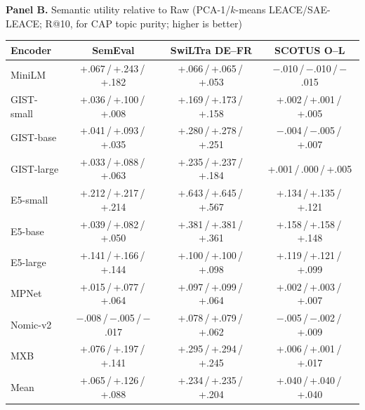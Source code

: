 \vspace{1pt}
\par{\textbf{Panel B.} Semantic utility relative to Raw (PCA-1/$k$-means LEACE/SAE-LEACE; R@10, for CAP topic purity; higher is better)}\par\vspace{1pt}
\begin{tabular}{lccc}
\toprule
Encoder & \multicolumn{1}{c}{SemEval} & \multicolumn{1}{c}{SwiLTra DE--FR} & \multicolumn{1}{c}{SCOTUS O--L} \\
\midrule
MiniLM & +.067\,/\,+.243\,/\,+.182 & +.066\,/\,+.065\,/\,+.053 & $-$.010\,/\,$-$.010\,/\,$-$.015 \\
\addlinespace[1pt]
GIST-small & +.036\,/\,+.100\,/\,+.008 & +.169\,/\,+.173\,/\,+.158 & +.002\,/\,+.001\,/\,+.005 \\
GIST-base & +.041\,/\,+.093\,/\,+.035 & +.280\,/\,+.278\,/\,+.251 & $-$.004\,/\,$-$.005\,/\,+.007 \\
GIST-large & +.033\,/\,+.088\,/\,+.063 & +.235\,/\,+.237\,/\,+.184 & +.001\,/\,.000\,/\,+.005 \\
\addlinespace[1pt]
E5-small & +.212\,/\,+.217\,/\,+.214 & +.643\,/\,+.645\,/\,+.567 & +.134\,/\,+.135\,/\,+.121 \\
E5-base & +.039\,/\,+.082\,/\,+.050 & +.381\,/\,+.381\,/\,+.361 & +.158\,/\,+.158\,/\,+.148 \\
E5-large & +.141\,/\,+.166\,/\,+.144 & +.100\,/\,+.100\,/\,+.098 & +.119\,/\,+.121\,/\,+.099 \\
\addlinespace[1pt]
MPNet & +.015\,/\,+.077\,/\,+.064 & +.097\,/\,+.099\,/\,+.064 & +.002\,/\,+.003\,/\,+.007 \\
Nomic-v2 & $-$.008\,/\,$-$.005\,/\,$-$.017 & +.078\,/\,+.079\,/\,+.062 & $-$.005\,/\,$-$.002\,/\,+.009 \\
MXB & +.076\,/\,+.197\,/\,+.141 & +.295\,/\,+.294\,/\,+.245 & +.006\,/\,+.001\,/\,+.017 \\
\midrule
Mean & +.065\,/\,+.126\,/\,+.088 & +.234\,/\,+.235\,/\,+.204 & +.040\,/\,+.040\,/\,+.040 \\
\bottomrule
\end{tabular}

